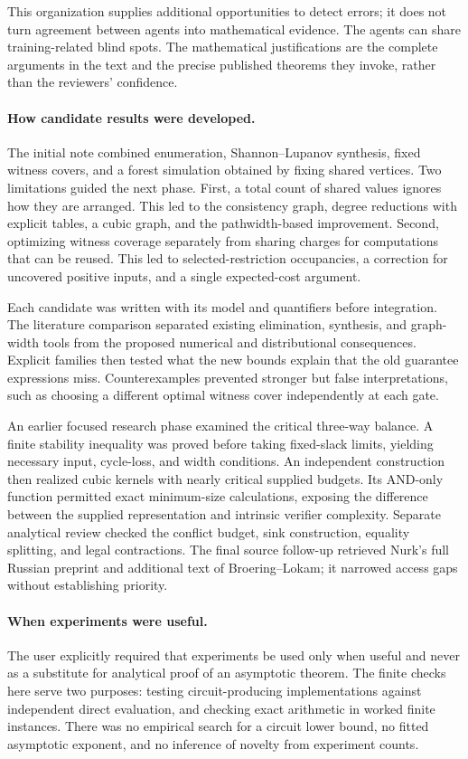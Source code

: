 This organization supplies additional opportunities to detect errors;
it does not turn agreement between agents into mathematical evidence.
The agents can share training-related blind spots. The mathematical
justifications are the complete arguments in the text and the precise
published theorems they invoke, rather than the reviewers' confidence.

\paragraph{How candidate results were developed.}
The initial note combined enumeration, Shannon--Lupanov synthesis,
fixed witness covers, and a forest simulation obtained by fixing shared
vertices. Two limitations guided the next phase. First, a total count
of shared values ignores how they are arranged. This led to the
consistency graph, degree reductions with explicit tables, a cubic
graph, and the pathwidth-based improvement. Second, optimizing witness
coverage separately from sharing charges for computations that can be
reused. This led to selected-restriction occupancies, a correction for
uncovered positive inputs, and a single expected-cost argument.

Each candidate was written with its model and quantifiers before
integration. The literature comparison separated existing elimination,
synthesis, and graph-width tools from the proposed numerical and
distributional consequences. Explicit families then tested what the
new bounds explain that the old guarantee expressions miss. Counterexamples
prevented stronger but false interpretations, such as choosing a
different optimal witness cover independently at each gate.

An earlier focused research phase examined the critical three-way balance.
A finite stability inequality was proved before taking fixed-slack
limits, yielding necessary input, cycle-loss, and width conditions.
An independent construction then realized cubic kernels with nearly
critical supplied budgets. Its AND-only function permitted exact
minimum-size calculations, exposing the difference between the supplied
representation and intrinsic verifier complexity. Separate analytical
review checked the conflict budget, sink construction, equality
splitting, and legal contractions. The final source follow-up retrieved
Nurk's full Russian preprint and additional text of Broering--Lokam;
it narrowed access gaps without establishing priority.

\paragraph{When experiments were useful.}
The user explicitly required that experiments be used only when useful
and never as a substitute for analytical proof of an asymptotic theorem.
The finite checks here serve two purposes: testing circuit-producing
implementations against independent direct evaluation, and checking
exact arithmetic in worked finite instances. There was no empirical
search for a circuit lower bound, no fitted asymptotic exponent, and
no inference of novelty from experiment counts.

